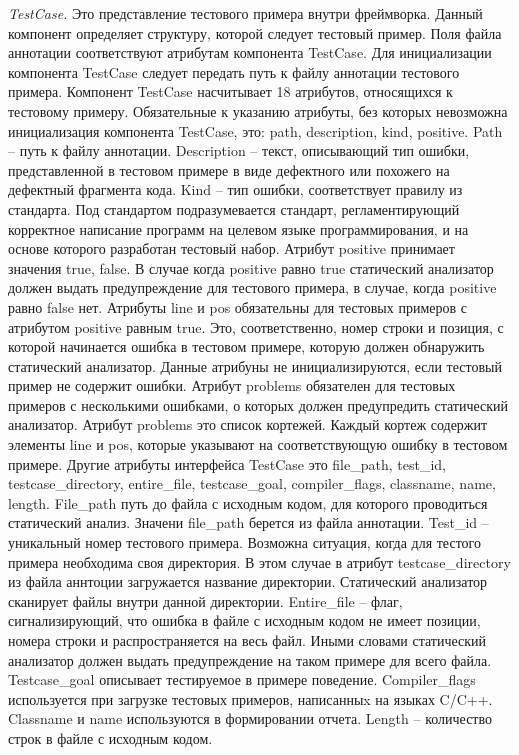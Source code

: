 \textit{TestCase.} Это представление тестового 
примера внутри фреймворка. Данный компонент определяет структуру, которой
следует тестовый пример. Поля файла аннотации соответствуют атрибутам компонента TestCase. Для инициализации компонента TestCase следует передать путь
к файлу аннотации тестового примера. Компонент TestCase насчитывает 18 атрибутов, относящихся к тестовому примеру. Обязательные к указанию атрибуты, без которых невозможна
инициализация компонента TestCase, это: path, description, kind, positive. Path -- 
путь к файлу аннотации. Description -- текст, описывающий тип ошибки, представленной в тестовом примере в виде дефектного или похожего на дефектный
фрагмента кода. Kind -- тип ошибки, соответствует правилу из стандарта. Под
стандартом подразумевается стандарт, регламентирующий корректное написание
программ на целевом языке программирования, и на основе которого разработан тестовый набор. Атрибут positive принимает значения true, false. В случае
когда positive равно true статический анализатор должен выдать предупреждение для тестового примера, в случае, когда positive равно false нет. Атрибуты
line и pos обязательны для тестовых примеров с атрибутом positive равным true.
Это, соответственно, номер строки и позиция, с которой начинается ошибка в тестовом примере, которую должен обнаружить статический анализатор. Данные
атрибуны не инициализируются, если тестовый пример не содержит ошибки.
Атрибут problems обязателен для тестовых примеров с несколькими ошибками, о которых должен предупредить статический анализатор. Атрибут problems
это список кортежей. Каждый кортеж содержит элементы line и pos, которые
указывают на соответствующую ошибку в тестовом примере. Другие атрибуты интерфейса TestCase это file\_path, test\_id, testcase\_directory, entire\_file, testcase\_goal,
compiler\_flags, classname, name, length. File\_path  путь до файла с исходным кодом, для которого проводиться статический анализ. Значени file\_path берется из
файла аннотации. Test\_id -- уникальный номер тестового примера. Возможна ситуация, когда для тестого примера необходима своя директория. В этом случае в
атрибут testcase\_directory из файла аннтоции загружается название директории.
Статический анализатор сканирует файлы внутри данной директории. Entire\_file
-- флаг, сигнализирующий, что ошибка в файле с исходным кодом не имеет
позиции, номера строки и распространяется на весь файл. Иными словами статический анализатор должен выдать предупреждение на таком примере для всего
файла. Testcase\_goal описывает тестируемое в примере поведение. Compiler\_flags 
используется при загрузке тестовых примеров, написанныx на языках C/C++.
Classname и name используются в формировании отчета. Length -- количество
строк в файле с исходным кодом.

